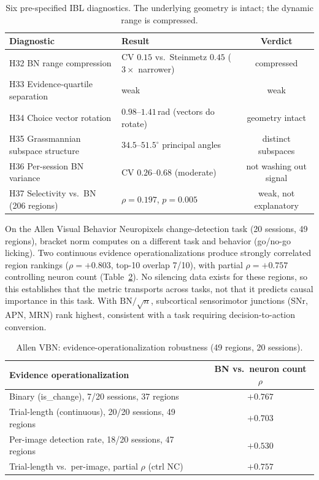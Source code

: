 \documentclass{article}
\begin{document}
\begin{table}[t]
\centering
\caption{Six pre-specified IBL diagnostics. The underlying geometry is intact; the dynamic range is compressed.}
\label{tab:ibl}
\begin{tabular}{llc}
\toprule
Diagnostic & Result & Verdict \\
\midrule
H32 BN range compression & CV $0.15$ vs.\ Steinmetz $0.45$ ($3\times$ narrower) & compressed \\
H33 Evidence-quartile separation & weak & weak \\
H34 Choice vector rotation & $0.98$--$1.41$\,rad (vectors do rotate) & geometry intact \\
H35 Grassmannian subspace structure & $34.5$--$51.5^\circ$ principal angles & distinct subspaces \\
H36 Per-session BN variance & CV $0.26$--$0.68$ (moderate) & not washing out signal \\
H37 Selectivity vs.\ BN (206 regions) & $\rho = 0.197$, $p = 0.005$ & weak, not explanatory \\
\bottomrule
\end{tabular}
\end{table}

On the Allen Visual Behavior Neuropixels change-detection task (20 sessions, 49 regions), bracket norm computes on a different task and behavior (go/no-go licking). Two continuous evidence operationalizations produce strongly correlated region rankings ($\rho = +0.803$, top-10 overlap 7/10), with partial $\rho = +0.757$ controlling neuron count (Table~\ref{tab:allen}). No silencing data exists for these regions, so this establishes that the metric transports across tasks, not that it predicts causal importance in this task. With $\text{BN}/\!\sqrt{n}$, subcortical sensorimotor junctions (SNr, APN, MRN) rank highest, consistent with a task requiring decision-to-action conversion.

\begin{table}[t]
\centering
\caption{Allen VBN: evidence-operationalization robustness (49 regions, 20 sessions).}
\label{tab:allen}
\small
\begin{tabular}{lc}
\toprule
Evidence operationalization & BN vs.\ neuron count $\rho$ \\
\midrule
Binary (is\_change), 7/20 sessions, 37 regions & $+0.767$ \\
Trial-length (continuous), 20/20 sessions, 49 regions & $+0.703$ \\
Per-image detection rate, 18/20 sessions, 47 regions & $+0.530$ \\
\midrule
Trial-length vs.\ per-image, partial $\rho$ (ctrl NC) & $\mathbf{+0.757}$ \\
\bottomrule
\end{tabular}
\end{table}
\end{document}
